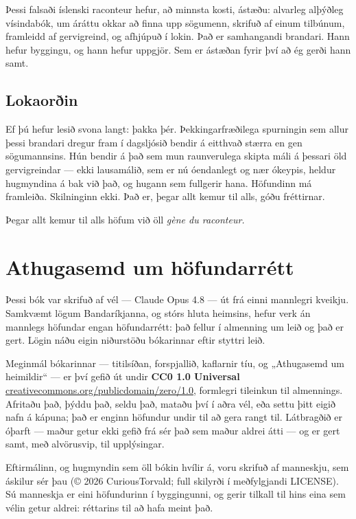 Þessi falsaði íslenski raconteur hefur, að minnsta kosti, ástæðu: alvarleg alþýðleg vísindabók, um áráttu okkar að finna upp sögumenn, skrifuð af einum tilbúnum, framleidd af gervigreind, og afhjúpuð í lokin. Það er samhangandi brandari. Hann hefur byggingu, og hann hefur uppgjör. Sem er ástæðan fyrir því að ég gerði hann samt.

\section*{Lokaorðin}

Ef þú hefur lesið svona langt: þakka þér. Þekkingarfræðilega spurningin sem allur þessi brandari dregur fram í dagsljósið bendir á eitthvað stærra en gen sögumannsins. Hún bendir á það sem mun raunverulega skipta máli á þessari öld gervigreindar — ekki lausamálið, sem er nú óendanlegt og nær ókeypis, heldur hugmyndina á bak við það, og hugann sem fullgerir hana. Höfundinn má framleiða. Skilninginn ekki. Það er, þegar allt kemur til alls, góðu fréttirnar.

Þegar allt kemur til alls höfum við öll \emph{gène du raconteur.}

\chapter*{Athugasemd um höfundarrétt}
{} %

Þessi bók var skrifuð af vél — Claude Opus 4.8 — út frá einni mannlegri kveikju. Samkvæmt lögum Bandaríkjanna, og stórs hluta heimsins, hefur verk án mannlegs höfundar engan höfundarrétt: það fellur í almenning um leið og það er gert. Lögin náðu eigin niðurstöðu bókarinnar eftir styttri leið.

Meginmál bókarinnar — titilsíðan, forspjallið, kaflarnir tíu, og „Athugasemd um heimildir“ — er því gefið út undir \textbf{CC0 1.0 Universal} \url{creativecommons.org/publicdomain/zero/1.0}, formlegri tileinkun til almennings. Afritaðu það, þýddu það, seldu það, mataðu því í aðra vél, eða settu þitt eigið nafn á kápuna; það er enginn höfundur undir til að gera rangt til. Látbragðið er óþarft — maður getur ekki gefið frá sér það sem maður aldrei átti — og er gert samt, með alvörusvip, til upplýsingar.

Eftirmálinn, og hugmyndin sem öll bókin hvílir á, voru skrifuð af manneskju, sem áskilur sér þau (© 2026 CuriousTorvald; full skilyrði í meðfylgjandi LICENSE). Sú manneskja er eini höfundurinn í byggingunni, og gerir tilkall til hins eina sem vélin getur aldrei: réttarins til að hafa meint það.

